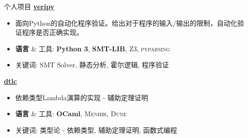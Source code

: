 \documentclass{resume}
\begin{document}
\begin{CJK*}{UTF8}{gbsn}
\begin{rSection}{个人项目}
		\textbf{\href{https://github.com/AD1024/veripy}{veripy}} %
		\vspace{-5pt}

		\begin{itemize}
			\setlength{\itemsep}{1pt}
            \setlength{\parskip}{0pt}
			\setlength{\parsep}{0pt}
			\item 面向Python的自动化程序验证。给出对于程序的输入/输出的限制，自动化验证程序是否正确实现。
			\item \textbf{语言} \& \textsc{工具}: \textbf{Python 3}, \textbf{SMT-LIB}, \textsc{Z3}, \textsc{pyparsing}
			\item 关键词: SMT Solver, 静态分析, 霍尔逻辑, 程序验证
		\end{itemize}

		\textbf{\href{https://github.com/AD1024/dtlc}{dtlc}} %
		\vspace{-5pt}

		\begin{itemize}
			\setlength{\itemsep}{1pt}
            \setlength{\parskip}{0pt}
			\setlength{\parsep}{0pt}
			\item 依赖类型Lambda演算的实现 - 辅助定理证明
			\item \textbf{语言} \& \textsc{工具}: \textbf{OCaml}, \textsc{Menhir}, \textsc{Dune}
			\item 关键词: 类型论 - 依赖类型, 辅助定理证明, 函数式编程
		\end{itemize}





\end{rSection}
\end{CJK*}
\end{document}
